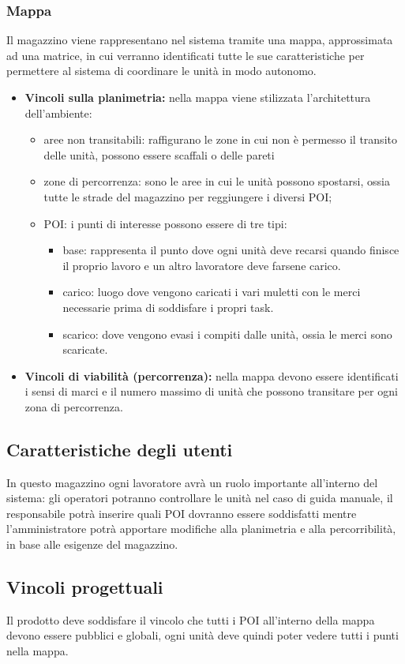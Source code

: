 \subsubsection{Mappa}
Il magazzino viene rappresentano nel sistema tramite una mappa, approssimata ad una matrice, in cui verranno identificati tutte le sue caratteristiche per permettere al sistema di coordinare le unità in modo autonomo.
\begin{itemize}
	\item \textbf{Vincoli sulla planimetria:} nella mappa viene stilizzata l'architettura dell'ambiente:
	\begin{itemize}
		\item aree non transitabili: raffigurano le zone in cui non è permesso il transito delle unità, possono essere scaffali o delle pareti
		\item zone di percorrenza: sono le aree in cui le unità possono spostarsi, ossia tutte le strade del magazzino per reggiungere i diversi POI;
		\item POI: i punti di interesse possono essere di tre tipi:
		\begin{itemize}
			\item base: rappresenta il punto dove ogni unità deve recarsi quando finisce il proprio lavoro e un altro lavoratore deve farsene carico.
			\item carico: luogo dove vengono caricati i vari muletti con le merci necessarie prima di soddisfare i propri task.
			\item scarico: dove vengono evasi i compiti dalle unità, ossia le merci sono scaricate.
		\end{itemize}
	\end{itemize}
	\item \textbf{Vincoli di viabilità (percorrenza):} nella mappa devono essere identificati i sensi di marci e il numero massimo di unità che possono transitare per ogni zona di percorrenza.
	
\end{itemize}

\subsection{Caratteristiche degli utenti}
In questo magazzino ogni lavoratore avrà un ruolo importante all'interno del sistema: gli operatori potranno controllare le unità nel caso di guida manuale, il responsabile potrà inserire quali POI dovranno essere soddisfatti mentre l'amministratore potrà apportare modifiche alla planimetria e alla percorribilità, in base alle esigenze del magazzino.
\subsection{Vincoli progettuali}
Il prodotto deve soddisfare il vincolo che tutti i POI all'interno della mappa devono essere pubblici e globali, ogni unità deve quindi poter vedere tutti i punti nella mappa.